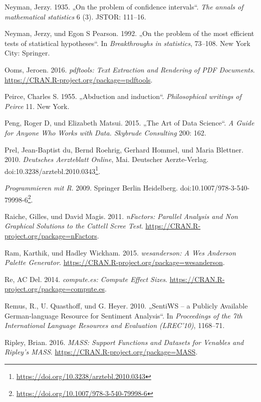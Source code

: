 \documentclass[12pt,ngerman,]{book}
\let\rmarkdownfootnote\footnote%
\def\footnote{\protect\rmarkdownfootnote}
\renewcommand{\href}[2]{#2\footnote{\url{#1}}}
\theoremstyle{definition}
\theoremstyle{definition}
\theoremstyle{remark}
\begin{document}
\hypertarget{ref-neyman1935problem}{}
Neyman, Jerzy. 1935. „On the problem of confidence intervals``.
\emph{The annals of mathematical statistics} 6 (3). JSTOR: 111--16.

\hypertarget{ref-neyman1992problem}{}
Neyman, Jerzy, und Egon S Pearson. 1992. „On the problem of the most
efficient tests of statistical hypotheses``. In \emph{Breakthroughs in
statistics}, 73--108. New York City: Springer.

\hypertarget{ref-R-pdftools}{}
Ooms, Jeroen. 2016. \emph{pdftools: Text Extraction and Rendering of PDF
Documents}. \url{https://CRAN.R-project.org/package=pdftools}.

\hypertarget{ref-peirce1955abduction}{}
Peirce, Charles S. 1955. „Abduction and induction``. \emph{Philosophical
writings of Peirce} 11. New York.

\hypertarget{ref-peng2015art}{}
Peng, Roger D, und Elizabeth Matsui. 2015. „The Art of Data Science``.
\emph{A Guide for Anyone Who Works with Data. Skybrude Consulting} 200:
162.

\hypertarget{ref-welchertest}{}
Prel, Jean-Baptist du, Bernd Roehrig, Gerhard Hommel, und Maria
Blettner. 2010. \emph{Deutsches Aerzteblatt Online}, Mai. Deutscher
Aerzte-Verlag.
doi:\href{https://doi.org/10.3238/arztebl.2010.0343}{10.3238/arztebl.2010.0343}.

\hypertarget{ref-ligges}{}
\emph{Programmieren mit R}. 2009. Springer Berlin Heidelberg.
doi:\href{https://doi.org/10.1007/978-3-540-79998-6}{10.1007/978-3-540-79998-6}.

\hypertarget{ref-R-nFactors}{}
Raiche, Gilles, und David Magis. 2011. \emph{nFactors: Parallel Analysis
and Non Graphical Solutions to the Cattell Scree Test}.
\url{https://CRAN.R-project.org/package=nFactors}.

\hypertarget{ref-R-wesanderson}{}
Ram, Karthik, und Hadley Wickham. 2015. \emph{wesanderson: A Wes
Anderson Palette Generator}.
\url{https://CRAN.R-project.org/package=wesanderson}.

\hypertarget{ref-R-compute.es}{}
Re, AC Del. 2014. \emph{compute.es: Compute Effect Sizes}.
\url{https://CRAN.R-project.org/package=compute.es}.

\hypertarget{ref-remquahey2010}{}
Remus, R., U. Quasthoff, und G. Heyer. 2010. „SentiWS -- a Publicly
Available German-language Resource for Sentiment Analysis``. In
\emph{Proceedings of the 7th International Language Resources and
Evaluation (LREC'10)}, 1168--71.

\hypertarget{ref-R-MASS}{}
Ripley, Brian. 2016. \emph{MASS: Support Functions and Datasets for
Venables and Ripley's MASS}.
\url{https://CRAN.R-project.org/package=MASS}.
\end{document}
